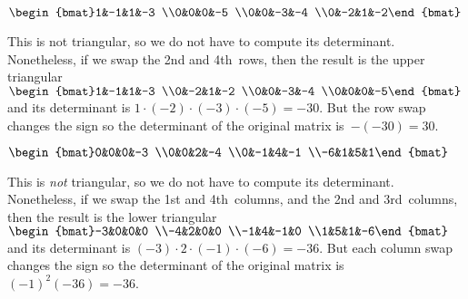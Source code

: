 \begin{example}
\begin{Parts}
\item \(\begin{bmat}1&-1&1&-3
\\0&0&0&-5
\\0&0&-3&-4
\\0&-2&1&-2\end{bmat}\)
\begin{solution} 
This is not triangular, so we do not have to compute its determinant. 
Nonetheless, if we swap the 2nd and 4th~rows, then the result is the upper triangular \(\begin{bmat}1&-1&1&-3
\\0&-2&1&-2
\\0&0&-3&-4
\\0&0&0&-5\end{bmat}\) and its determinant is \(1\cdot(-2)\cdot(-3)\cdot(-5)=-30\). 
But the row swap changes the sign so the determinant of the original matrix is~\(-(-30)=30\).
\end{solution}

\item \(\begin{bmat}0&0&0&-3
\\0&0&2&-4
\\0&-1&4&-1
\\-6&1&5&1\end{bmat}\)
\begin{solution} 
This is \emph{not} triangular, so we do not have to compute its determinant. 
Nonetheless, if we swap the 1st and 4th~columns, and the 2nd and 3rd~columns, then the result is the lower triangular \(\begin{bmat}-3&0&0&0
\\-4&2&0&0
\\-1&4&-1&0
\\1&5&1&-6\end{bmat}\) and its determinant is \((-3)\cdot2\cdot(-1)\cdot(-6)=-36\). 
But each column swap changes the sign so the determinant of the original matrix is~\((-1)^2(-36)=-36\). 
\end{solution}


\end{Parts}
\end{example}
